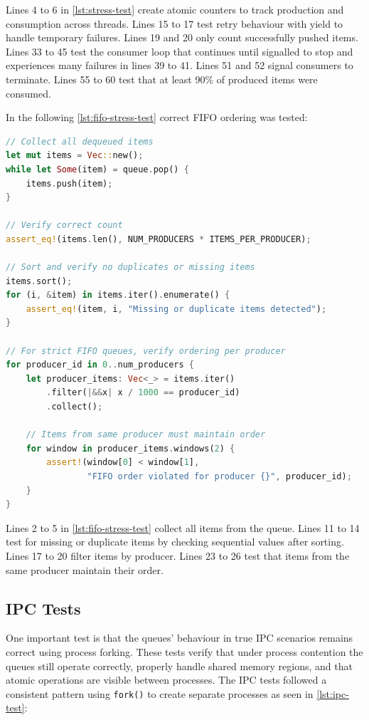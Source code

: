 Lines 4 to 6 in \cref{lst:stress-test} create atomic counters to track production and consumption across threads. Lines 15 to 17 test retry behaviour with yield to handle temporary failures. Lines 19 and 20 only count successfully pushed items. Lines 33 to 45 test the consumer loop that continues until signalled to stop and experiences many failures in lines 39 to 41. Lines 51 and 52 signal consumers to terminate. Lines 55 to 60 test that at least 90\% of produced items were consumed.

In the following \cref{lst:fifo-stress-test} correct \ac{FIFO} ordering was tested:

\begin{lstlisting}[language=Rust, style=boxed, caption={FIFO ordering verification under stress}, label={lst:fifo-stress-test}]
// Collect all dequeued items
let mut items = Vec::new();
while let Some(item) = queue.pop() {
    items.push(item);
}

// Verify correct count
assert_eq!(items.len(), NUM_PRODUCERS * ITEMS_PER_PRODUCER);

// Sort and verify no duplicates or missing items
items.sort();
for (i, &item) in items.iter().enumerate() {
    assert_eq!(item, i, "Missing or duplicate items detected");
}

// For strict FIFO queues, verify ordering per producer
for producer_id in 0..num_producers {
    let producer_items: Vec<_> = items.iter()
        .filter(|&&x| x / 1000 == producer_id)
        .collect();
    
    // Items from same producer must maintain order
    for window in producer_items.windows(2) {
        assert!(window[0] < window[1], 
                "FIFO order violated for producer {}", producer_id);
    }
}
\end{lstlisting}

Lines 2 to 5 in \cref{lst:fifo-stress-test} collect all items from the queue. Lines 11 to 14 test for missing or duplicate items by checking sequential values after sorting. Lines 17 to 20 filter items by producer. Lines 23 to 26 test that items from the same producer maintain their order.

\subsection{\acf{IPC} Tests}
One important test is that the queues' behaviour in true \ac{IPC} scenarios remains correct using process forking. These tests verify that under process contention the queues still operate correctly, properly handle shared memory regions, and that atomic operations are visible between processes. The \ac{IPC} tests followed a consistent pattern using \texttt{fork()} to create separate processes as seen in \cref{lst:ipc-test}:

